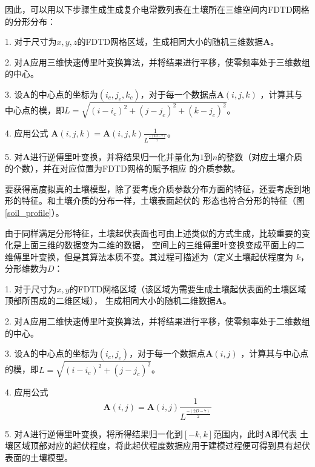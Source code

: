 因此，可以用以下步骤生成生成复介电常数列表在土壤所在三维空间内FDTD网格的分形分布：

1. 对于尺寸为$x,y,z$的FDTD网格区域，生成相同大小的随机三维数据$\mathbf{A}$。

2. 对$\mathbf{A}$应用三维快速傅里叶变换算法，并将结果进行平移，使零频率处于三维数组
的中心。

3. 设$\mathbf{A}$的中心点的坐标为$(i_c,j_c,k_c)$，对于每一个数据点$\mathbf{A}(i,j,k)$
，计算其与中心点的模，即$L=\sqrt{(i - i_c)^2 + (j - j_c)^2 + (k - j_c)^2}$。

4. 应用公式 $\mathbf{A}(i,j,k) = \mathbf{A}(i,j,k) \frac{1}{L^{\frac{-(2 D-7)}{2}}}$。

5. 对$\mathbf{A}$进行逆傅里叶变换，并将结果归一化并量化为$1$到$n$的整数（对应土壤介质的个数），并在对应位置为FDTD网格的赋予相应
的介质参数。

要获得高度拟真的土壤模型，除了要考虑介质参数分布方面的特征，还要考虑到地形的特征。和土壤介质的分布一样，土壤表面起伏的
形态也符合分形的特征（图\ref{soil_profile}）。

由于同样满足分形特征，土壤起伏表面也可由上述类似的方式生成，比较重要的变化是上面三维的数据变为二维的数据，
空间上的三维傅里叶变换变成平面上的二维傅里叶变换，但是其算法本质不变。其过程可描述为（定义土壤起伏程度为
$k$，分形维数为$D$：

1. 对于尺寸为$x,y$的FDTD网格区域（该区域为需要生成土壤起伏表面的土壤区域顶部所围成的二维区域），
生成相同大小的随机二维数据$\mathbf{A}$。

2. 对$\mathbf{A}$应用二维快速傅里叶变换算法，并将结果进行平移，使零频率处于二维数组
的中心。

3. 设$\mathbf{A}$的中心点的坐标为$(i_c,j_c)$，对于每一个数据点$\mathbf{A}(i,j)$
，计算其与中心点的模，即$L=\sqrt{(i - i_c)^2 + (j - j_c)^2}$。

4. 应用公式 
\begin{equation}
	\label{eqn:fractal_2d}
	\mathbf{A}(i,j) = \mathbf{A}(i,j) \frac{1}{L^{\frac{-(2 D-7)}{2}}}
\end{equation}

5. 对$\mathbf{A}$进行逆傅里叶变换，将所得结果归一化到$[-k,k]$范围内，此时$\mathbf{A}$即代表
土壤区域顶部对应的起伏程度，将此起伏程度数据应用于建模过程便可得到具有起伏表面的土壤模型。
